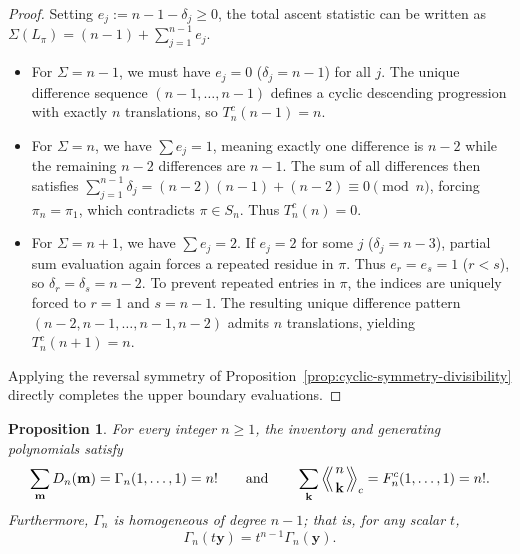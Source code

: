 \documentclass[11pt,a4paper]{amsart}
\newtheorem{proposition}[theorem]{Proposition}
\newcommand{\1}{\mathbf{1}}
\newcommand{\LE}[1]{\left\langle\!\!\left\langle #1 \right\rangle\!\!\right\rangle}
\begin{document}
\begin{proof}
Setting $e_j := n - 1 - \delta_j \ge 0$, the total ascent statistic can be written as $\Sigma(L_\pi) = (n-1) + \sum_{j=1}^{n-1} e_j$.

\begin{itemize}
    \item For $\Sigma = n-1$, we must have $e_j = 0$ ($\delta_j = n-1$) for all $j$. The unique difference sequence $(n-1, \dots, n-1)$ defines a cyclic descending progression with exactly $n$ translations, so $T_n^c(n-1) = n$.
    
    \item For $\Sigma = n$, we have $\sum e_j = 1$, meaning exactly one difference is $n-2$ while the remaining $n-2$ differences are $n-1$. The sum of all differences then satisfies $\sum_{j=1}^{n-1} \delta_j = (n-2)(n-1) + (n-2) \equiv 0 \pmod n$, forcing $\pi_n = \pi_1$, which contradicts $\pi \in S_n$. Thus $T_n^c(n) = 0$.
    
    \item For $\Sigma = n+1$, we have $\sum e_j = 2$. If $e_j = 2$ for some $j$ ($\delta_j = n-3$), partial sum evaluation again forces a repeated residue in $\pi$. Thus $e_r = e_s = 1$ ($r < s$), so $\delta_r = \delta_s = n-2$. To prevent repeated entries in $\pi$, the indices are uniquely forced to $r = 1$ and $s = n-1$. The resulting unique difference pattern $(n-2, n-1, \dots, n-1, n-2)$ admits $n$ translations, yielding $T_n^c(n+1) = n$.
\end{itemize}

Applying the reversal symmetry of Proposition~\ref{prop:cyclic-symmetry-divisibility} directly completes the upper boundary evaluations.
\end{proof}





\begin{proposition}
\label{prop:cyclic-mass}
For every integer $n \ge 1$, the inventory and generating polynomials satisfy
\begin{equation}
\sum_{\mathbf{m}} D_n(\mathbf{m}) = \Gamma_n(1, \dots, 1) = n! \qquad \text{and} \qquad \sum_{\mathbf{k}} \LE{n \atop \mathbf{k}}_c = F_n^c(1, \dots, 1) = n!.
\end{equation}
Furthermore, $\Gamma_n$ is homogeneous of degree $n-1$; that is, for any scalar $t$,
\begin{equation}
\Gamma_n(t\bm{y}) = t^{n-1}\Gamma_n(\bm{y}).
\end{equation}
\end{proposition}
\end{document}
